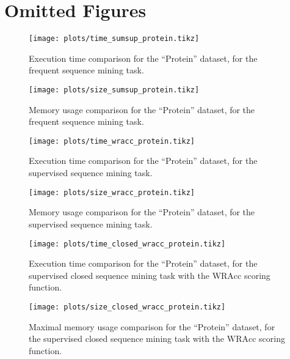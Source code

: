 \documentclass{sigkddExp}
\newcommand{\wracc}{\mathrm{WRAcc}}
\begin{document}
\newpage
\printbibliography

\appendix

\section{Omitted Figures}

\begin{figure}[!hbtp]
	\centering
	\texttt{[image: plots/time\_sumsup\_protein.tikz]}
	\caption{Execution time comparison for the ``Protein'' dataset, for the frequent sequence mining task.}
	\label{fig:time_sumsup_protein}
\end{figure}

\begin{figure}[!hbtp]
	\centering
	\texttt{[image: plots/size\_sumsup\_protein.tikz]}
	\caption{Memory usage comparison for the ``Protein'' dataset, for the frequent sequence mining task.}
	\label{fig:size_sumsup_protein}
\end{figure}

\begin{figure}[!hbtp]
	\centering
	\texttt{[image: plots/time\_wracc\_protein.tikz]}
	\caption{Execution time comparison for the ``Protein'' dataset, for the supervised sequence mining task.}
	\label{fig:time_wracc_protein}
\end{figure}

\begin{figure}[!hbtp]
	\centering
	\texttt{[image: plots/size\_wracc\_protein.tikz]}
	\caption{Memory usage comparison for the ``Protein'' dataset, for the supervised sequence mining task.}
	\label{fig:size_wracc_protein}
\end{figure}

\begin{figure}[!hbtp]
	\centering
	\texttt{[image: plots/time\_closed\_wracc\_protein.tikz]}
	\caption{Execution time comparison for the ``Protein'' dataset, for the supervised closed sequence mining task with the \(\wracc\) scoring function.}
	\label{fig:time_closed_wracc_protein}
\end{figure}

\begin{figure}[!hbtp]
	\centering
	\texttt{[image: plots/size\_closed\_wracc\_protein.tikz]}
	\caption{Maximal memory usage comparison for the ``Protein'' dataset, for the supervised closed sequence mining task with the \(\wracc\) scoring function.}
	\label{fig:size_closed_wracc_protein}
\end{figure}
\end{document}
